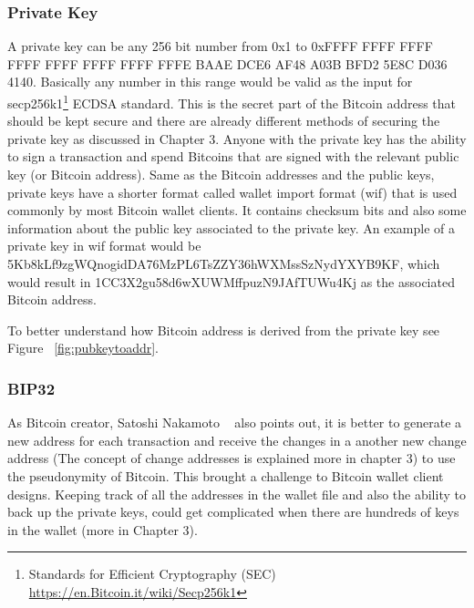 \subsubsection{Private Key}
A private key can be any 256 bit number from 0x1 to 0xFFFF FFFF FFFF FFFF FFFF FFFF FFFF FFFE BAAE DCE6 AF48 A03B BFD2 5E8C D036 4140. Basically any number in this range would be valid as the input for secp256k1\footnote{Standards for Efficient Cryptography (SEC) \url{https://en.Bitcoin.it/wiki/Secp256k1}} ECDSA standard. This is the secret part of the Bitcoin address that should be kept secure and there are already different methods of securing the private key as discussed in Chapter 3. Anyone with the private key has the ability to sign a transaction and spend Bitcoins that are signed with the relevant public key (or Bitcoin address). 
Same as the Bitcoin addresses and the public keys, private keys have a shorter format called wallet import format (wif) that is used commonly by most Bitcoin wallet clients. It contains checksum bits and also some information about the public key associated to the private key. An example of a private key in wif format would be 5Kb8kLf9zgWQnogidDA76MzPL6TsZZY36hWXMssSzNydYXYB9KF, which would result in 1CC3X2gu58d6wXUWMffpuzN9JAfTUWu4Kj as the associated Bitcoin address.

To better understand how Bitcoin address is derived from the private key see Figure  ~\ref{fig:pubkeytoaddr}.

\subsubsection{BIP32} \label{BIP32}
As Bitcoin creator, Satoshi Nakamoto ~\cite{Nak08} also points out, it is better to generate a new address for each transaction and receive the changes in a another new change address (The concept of change addresses is explained more in chapter 3) to use the pseudonymity of Bitcoin. This brought a challenge to Bitcoin wallet client designs. Keeping track of all the addresses in the wallet file and also the ability to back up the private keys, could get complicated when there are hundreds of keys in the wallet (more in Chapter 3). \\

